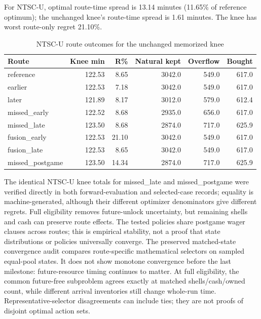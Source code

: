 \documentclass[11pt]{article}
\theoremstyle{definition}\newtheorem{definition}[theorem]{Definition}
\begin{document}
For NTSC-U, optimal route-time spread is 13.14 minutes (11.65\% of reference optimum); the unchanged knee's route-time spread is 1.61 minutes. The knee has worst route-only regret 21.10\%. \begin{table}[H]\centering\small
\begin{tabular}{lrrrrr}\toprule
Route & Knee min & R\% & Natural kept & Overflow & Bought\\\midrule
reference & 122.53 & 8.65 & 3042.0 & 549.0 & 617.0\\
earlier & 122.53 & 7.18 & 3042.0 & 549.0 & 617.0\\
later & 121.89 & 8.17 & 3012.0 & 579.0 & 612.4\\
missed\_early & 122.52 & 8.68 & 2935.0 & 656.0 & 617.0\\
missed\_late & 123.50 & 8.68 & 2874.0 & 717.0 & 625.9\\
fusion\_early & 122.53 & 21.10 & 3042.0 & 549.0 & 617.0\\
fusion\_late & 122.53 & 8.65 & 3042.0 & 549.0 & 617.0\\
missed\_postgame & 123.50 & 14.34 & 2874.0 & 717.0 & 625.9\\
\bottomrule\end{tabular}
\caption{NTSC-U route outcomes for the unchanged memorized knee}\label{tab:result-9}\end{table}
The identical NTSC-U knee totals for missed\_late and missed\_postgame were verified directly in both forward-evaluation and selected-case records; equality is machine-generated, although their different optimizer denominators give different regrets. Full eligibility removes future-unlock uncertainty, but remaining shells and cash can preserve route effects. The tested policies share postgame wager clauses across routes; this is empirical stability, not a proof that state distributions or policies universally converge. The preserved matched-state convergence audit compares route-specific mathematical selectors on sampled equal-pool states. It does not show monotone convergence before the last milestone: future-resource timing continues to matter. At full eligibility, the common future-free subproblem agrees exactly at matched shells/cash/owned count, while different arrival inventories still change whole-run time. Representative-selector disagreements can include ties; they are not proofs of disjoint optimal action sets.
\end{document}
